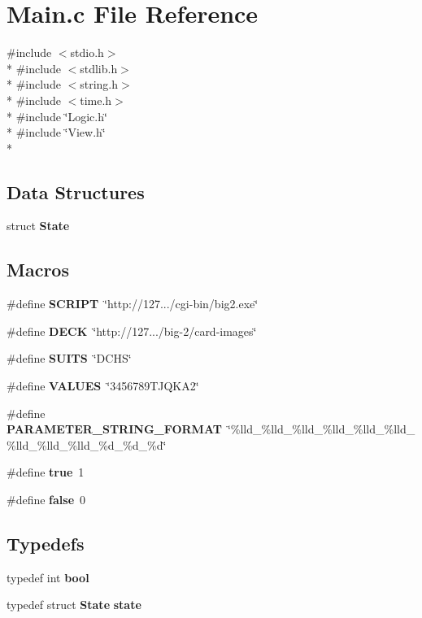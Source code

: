 \section{Main.\+c File Reference}
\label{_main_8c}
{\ttfamily \#include $<$stdio.\+h$>$}\\*
{\ttfamily \#include $<$stdlib.\+h$>$}\\*
{\ttfamily \#include $<$string.\+h$>$}\\*
{\ttfamily \#include $<$time.\+h$>$}\\*
{\ttfamily \#include \char`\"{}Logic.\+h\char`\"{}}\\*
{\ttfamily \#include \char`\"{}View.\+h\char`\"{}}\\*
\subsection*{Data Structures}
\begin{DoxyCompactItemize}
\item 
struct {\bf State}
\end{DoxyCompactItemize}
\subsection*{Macros}
\begin{DoxyCompactItemize}
\item 
\#define {\bf S\+C\+R\+I\+PT}~\char`\"{}http\+://127.../cgi-\/bin/big2.\+exe\char`\"{}
\item 
\#define {\bf D\+E\+CK}~\char`\"{}http\+://127.../big-\/2/card-\/images\char`\"{}
\item 
\#define {\bf S\+U\+I\+TS}~\char`\"{}D\+C\+HS\char`\"{}
\item 
\#define {\bf V\+A\+L\+U\+ES}~\char`\"{}3456789\+T\+J\+Q\+K\+A2\char`\"{}
\item 
\#define {\bf P\+A\+R\+A\+M\+E\+T\+E\+R\+\_\+\+S\+T\+R\+I\+N\+G\+\_\+\+F\+O\+R\+M\+AT}~\char`\"{}\%lld\+\_\+\%lld\+\_\+\%lld\+\_\+\%lld\+\_\+\%lld\+\_\+\%lld\+\_\+\%lld\+\_\+\%lld\+\_\+\%lld\+\_\+\%d\+\_\+\%d\+\_\+\%d\char`\"{}
\item 
\#define {\bf true}~1
\item 
\#define {\bf false}~0
\end{DoxyCompactItemize}
\subsection*{Typedefs}
\begin{DoxyCompactItemize}
\item 
typedef int {\bf bool}
\item 
typedef struct {\bf State} {\bf state}
\end{DoxyCompactItemize}
